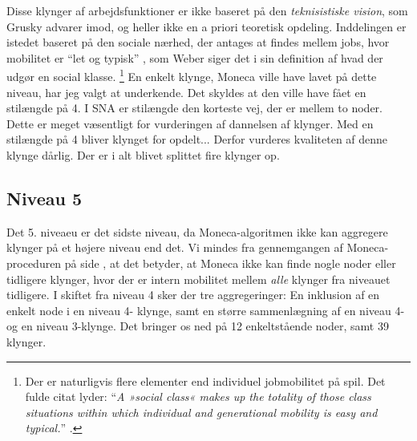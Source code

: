 Disse klynger af arbejdsfunktioner er ikke baseret på den \emph{teknisistiske vision}, som Grusky advarer imod, og heller ikke en a priori teoretisk opdeling. Inddelingen er istedet baseret på den sociale nærhed, der antages at findes mellem jobs, hvor mobilitet er “let og typisk” , som Weber siger det i sin definition af hvad der udgør en social klasse. %
%
\footnote{Der er naturligvis flere elementer end individuel jobmobilitet på spil. Det fulde citat lyder: “\textit{A »social class« makes up the totality of those class situations within which individual and generational mobility is easy and typical.}” \parencite[302]{Weber1978}. }%
%
En enkelt klynge, Moneca ville have lavet på dette niveau, har jeg valgt at underkende. Det skyldes at den ville have fået en stilængde på 4. I SNA er stilængde den korteste vej, der er mellem to noder. Dette er meget væsentligt for vurderingen af dannelsen af klynger. Med en stilængde på 4 bliver klynget for opdelt... Derfor vurderes kvaliteten af denne klynge dårlig. Der er i alt blivet splittet fire klynger op. 


\newpage \subsection{Niveau 5 \label{delanalyse1_endelige mobilitetskort}}

Det 5. niveaeu er det sidste niveau, da Moneca-algoritmen ikke kan aggregere klynger på et højere niveau end det. Vi mindes fra gennemgangen af Moneca-proceduren på side  \pageref{metode_monecastepbystep}, at det betyder, at Moneca ikke kan finde nogle noder eller tidligere klynger, hvor der er intern mobilitet mellem  \emph{alle} klynger fra niveauet tidligere. %
I skiftet fra niveau 4 sker der tre aggregeringer: En inklusion af en enkelt node i en niveau 4- klynge, samt en større sammenlægning af en niveau 4- og en niveau 3-klynge. Det bringer os ned på 12 enkeltstående noder, samt 39 klynger. 

